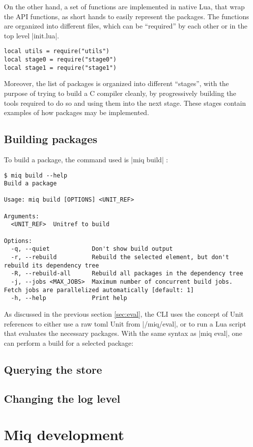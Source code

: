 On the other hand, a set of functions are implemented in
native Lua, that wrap the API functions, as short hands to
easily represent the packages. The functions are organized
into different files, which can be ``required'' by each
other or in the top level |init.lua|.

\begin{verbatim}
local utils = require("utils")
local stage0 = require("stage0")
local stage1 = require("stage1")
\end{verbatim}

Moreover, the list of packages is organized into different
``stages'', with the purpose of trying to build a C compiler
cleanly, by progressively building the tools required to do
so and using them into the next stage. These stages contain
examples of how packages may be implemented.


\subsection{Building packages}

To build a package, the command used is |miq build| :
\begin{verbatim}
$ miq build --help
Build a package

Usage: miq build [OPTIONS] <UNIT_REF>

Arguments:
  <UNIT_REF>  Unitref to build

Options:
  -q, --quiet            Don't show build output
  -r, --rebuild          Rebuild the selected element, but don't rebuild its dependency tree
  -R, --rebuild-all      Rebuild all packages in the dependency tree
  -j, --jobs <MAX_JOBS>  Maximum number of concurrent build jobs. Fetch jobs are parallelized automatically [default: 1]
  -h, --help             Print help
\end{verbatim}

As discussed in the previous section \ref{sec:eval}, the
\ac{CLI} uses the concept of Unit references to either use a
raw toml Unit from |/miq/eval|, or to run a Lua script that
evaluates the necessary packages. With the same syntax as
|miq eval|, one can perform a build for a selected package:


\subsection{Querying the store}

\subsection{Changing the log level}



\section{Miq development}

